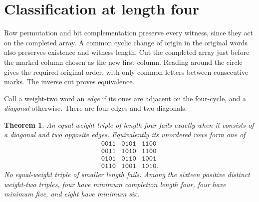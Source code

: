 \documentclass[11pt]{article}
\newtheorem{theorem}{Theorem}[section]
\newcommand{\w}[1]{\texttt{#1}}
\begin{document}
\section{Classification at length four}
Row permutation and bit complementation preserve every witness, since they act on the completed array. A common cyclic change of origin in the original words also preserves existence and witness length. Cut the completed array just before the marked column chosen as the new first column. Reading around the circle gives the required original order, with only common letters between consecutive marks. The inverse cut proves equivalence.

Call a weight-two word an \emph{edge} if its ones are adjacent on the four-cycle, and a \emph{diagonal} otherwise. There are four edges and two diagonals.
\begin{theorem}\label{class}
An equal-weight triple of length four fails exactly when it consists of a diagonal and two opposite edges. Equivalently its unordered rows form one of
\[
\begin{array}{ccc}
\w{0011}&\w{0101}&\w{1100}\\
\w{0011}&\w{1010}&\w{1100}\\
\w{0101}&\w{0110}&\w{1001}\\
\w{0110}&\w{1001}&\w{1010}.
\end{array}
\]
No equal-weight triple of smaller length fails. Among the sixteen positive distinct weight-two triples, four have minimum completion length four, four have minimum five, and eight have minimum six.
\end{theorem}
\end{document}
